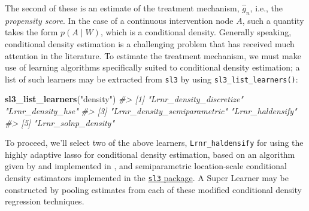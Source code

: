 \documentclass[12pt, krantz2,]{krantz}
\newenvironment{Shaded}{\begin{snugshade}}{\end{snugshade}}
\newcommand{\CommentTok}[1]{\textcolor[rgb]{0.37,0.37,0.37}{\textit{#1}}}
\newcommand{\DataTypeTok}[1]{\textcolor[rgb]{0.27,0.27,0.27}{#1}}
\newcommand{\DecValTok}[1]{\textcolor[rgb]{0.06,0.06,0.06}{#1}}
\newcommand{\KeywordTok}[1]{\textcolor[rgb]{0.27,0.27,0.27}{\textbf{#1}}}
\newcommand{\NormalTok}[1]{#1}
\newcommand{\OperatorTok}[1]{\textcolor[rgb]{0.43,0.43,0.43}{\textbf{#1}}}
\newcommand{\StringTok}[1]{\textcolor[rgb]{0.5,0.5,0.5}{#1}}
\theoremstyle{definition}
\theoremstyle{definition}
\theoremstyle{definition}
\newcommand{\1}{\mathbbm{1}}
\begin{document}
\begin{Shaded}
\end{Shaded}

The second of these is an estimate of the treatment mechanism, \(\hat{g}_n\),
i.e., the \emph{propensity score}. In the case of a continuous intervention node \(A\),
such a quantity takes the form \(p(A \mid W)\), which is a conditional density.
Generally speaking, conditional density estimation is a challenging problem that
has received much attention in the literature. To estimate the treatment
mechanism, we must make use of learning algorithms specifically suited to
conditional density estimation; a list of such learners may be extracted from
\texttt{sl3} by using \texttt{sl3\_list\_learners()}:

\begin{Shaded}
\begin{Highlighting}[]
\KeywordTok{sl3_list_learners}\NormalTok{(}\StringTok{"density"}\NormalTok{)}
\CommentTok{#> [1] "Lrnr_density_discretize"     "Lrnr_density_hse"           }
\CommentTok{#> [3] "Lrnr_density_semiparametric" "Lrnr_haldensify"            }
\CommentTok{#> [5] "Lrnr_solnp_density"}
\end{Highlighting}
\end{Shaded}

To proceed, we'll select two of the above learners, \texttt{Lrnr\_haldensify} for using
the highly adaptive lasso for conditional density estimation, based on an
algorithm given by \citet{diaz2011super} and implemented in \citet{hejazi2020haldensify}, and
semiparametric location-scale conditional density estimators implemented in the
\href{https://github.com/tlverse/sl3}{\texttt{sl3} package}. A Super Learner may be
constructed by pooling estimates from each of these modified conditional density
regression techniques.
\end{document}
